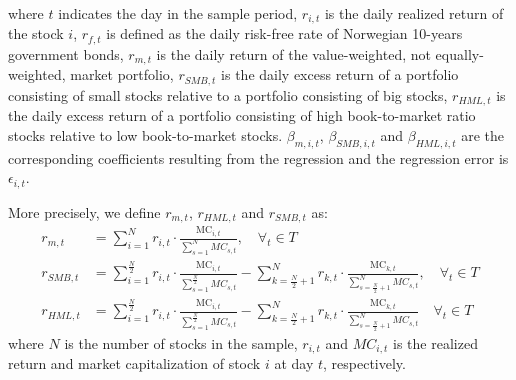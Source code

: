 where $t$ indicates the day in the sample period, $r_{i,t}$ is the daily realized return of the stock $i$, $r_{f,t}$ is defined as the daily risk-free rate of Norwegian 10-years government bonds, $r_{m,t}$ is the daily return of the value-weighted, not equally-weighted, market portfolio, $r_{SMB,t}$ is the daily excess return of a portfolio consisting of small stocks relative to a portfolio consisting of big stocks, $r_{HML,t}$ is the daily excess return of a portfolio consisting of high book-to-market ratio stocks relative to low book-to-market stocks. $\beta_{m,i,t}$, $\beta_{SMB,i,t}$ and $\beta_{HML,i,t}$ are the corresponding coefficients resulting from the regression and the regression error is $\epsilon_{i,t}$.

More precisely, we define $r_{m,t}$, $r_{HML,t}$ and $r_{SMB,t}$ as:
\begin{align}
    r_{m,t} &= \sum_{i=1}^{N} r_{i,t} \cdot \frac{\text{MC}_{i,t}}{\sum_{s=1}^{N} MC_{s,t}},  \quad  \forall_t \in T \\
    r_{SMB,t} &= \sum_{i=1}^{\frac{N}{2}} r_{i,t} \cdot \frac{\text{MC}_{i,t}}{\sum_{s=1}^{\frac{N}{2}} MC_{s,t}} - \sum_{k=\frac{N}{2}+1}^{N} r_{k,t} \cdot \frac{\text{MC}_{k,t}}{\sum_{s={\frac{N}{2}+1}}^{N} MC_{s,t}}, \quad  \forall_t \in T \\
    r_{HML,t} &= \sum_{i=1}^{\frac{N}{2}} r_{i,t} \cdot \frac{\text{MC}_{i,t}}{\sum_{s=1}^{\frac{N}{2}} MC_{s,t}} - \sum_{k=\frac{N}{2}+1}^{N} r_{k,t} \cdot \frac{\text{MC}_{k,t}}{\sum_{s=\frac{N}{2}+1}^{N} MC_{s,t}} \quad  \forall_t \in T
\end{align}
where $N$ is the number of stocks in the sample, $r_{i,t}$ and $MC_{i,t}$ is the realized return and market capitalization of stock $i$ at day $t$, respectively. 

